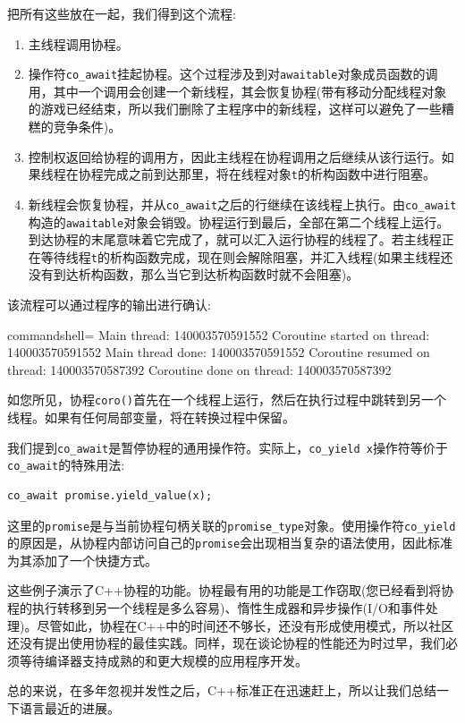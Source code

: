 把所有这些放在一起，我们得到这个流程:

\begin{enumerate}
\item
主线程调用协程。

\item
操作符\texttt{co\_await}挂起协程。这个过程涉及到对\texttt{awaitable}对象成员函数的调用，其中一个调用会创建一个新线程，其会恢复协程(带有移动分配线程对象的游戏已经结束，所以我们删除了主程序中的新线程，这样可以避免了一些糟糕的竞争条件)。

\item
控制权返回给协程的调用方，因此主线程在协程调用之后继续从该行运行。如果线程在协程完成之前到达那里，将在线程对象\texttt{t}的析构函数中进行阻塞。

\item 
新线程会恢复协程，并从\texttt{co\_await}之后的行继续在该线程上执行。由\texttt{co\_await}构造的\texttt{awaitable}对象会销毁。协程运行到最后，全部在第二个线程上运行。到达协程的末尾意味着它完成了，就可以汇入运行协程的线程了。若主线程正在等待线程\texttt{t}的析构函数完成，现在则会解除阻塞，并汇入线程(如果主线程还没有到达析构函数，那么当它到达析构函数时就不会阻塞)。
\end{enumerate}

该流程可以通过程序的输出进行确认:

\begin{tcblisting}{commandshell={}}
Main thread: 140003570591552
Coroutine started on thread: 140003570591552
Main thread done: 140003570591552
Coroutine resumed on thread: 140003570587392
Coroutine done on thread: 140003570587392
\end{tcblisting}

如您所见，协程\texttt{coro()}首先在一个线程上运行，然后在执行过程中跳转到另一个线程。如果有任何局部变量，将在转换过程中保留。

我们提到\texttt{co\_await}是暂停协程的通用操作符。实际上，\texttt{co\_yield x}操作符等价于\texttt{co\_await}的特殊用法:

\begin{lstlisting}[style=styleCXX]
co_await promise.yield_value(x);
\end{lstlisting}

这里的\texttt{promise}是与当前协程句柄关联的\texttt{promise\_type}对象。使用操作符\texttt{co\_yield}的原因是，从协程内部访问自己的\texttt{promise}会出现相当复杂的语法使用，因此标准为其添加了一个快捷方式。

这些例子演示了C++协程的功能。协程最有用的功能是工作窃取(您已经看到将协程的执行转移到另一个线程是多么容易)、惰性生成器和异步操作(I/O和事件处理)。尽管如此，协程在C++中的时间还不够长，还没有形成使用模式，所以社区还没有提出使用协程的最佳实践。同样，现在谈论协程的性能还为时过早，我们必须等待编译器支持成熟的和更大规模的应用程序开发。 

总的来说，在多年忽视并发性之后，C++标准正在迅速赶上，所以让我们总结一下语言最近的进展。









